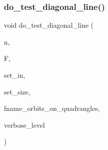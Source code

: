 \subsubsection{\texorpdfstring{do\+\_\+test\+\_\+diagonal\+\_\+line()}{do\_test\_diagonal\_line()}}
{\footnotesize\ttfamily void do\+\_\+test\+\_\+diagonal\+\_\+line (\begin{DoxyParamCaption}\item[{\mbox{\hyperlink{galois_8h_a09fddde158a3a20bd2dcadb609de11dc}{I\+NT}}}]{n,  }\item[{\mbox{\hyperlink{classfinite__field}{finite\+\_\+field}} $\ast$}]{F,  }\item[{\mbox{\hyperlink{galois_8h_a09fddde158a3a20bd2dcadb609de11dc}{I\+NT}} $\ast$}]{set\+\_\+in,  }\item[{\mbox{\hyperlink{galois_8h_a09fddde158a3a20bd2dcadb609de11dc}{I\+NT}}}]{set\+\_\+size,  }\item[{\mbox{\hyperlink{galois_8h_ab6cc7b4aeb6ea31aba2b3fbfc83ff5e6}{B\+Y\+TE}} $\ast$}]{fname\+\_\+orbits\+\_\+on\+\_\+quadrangles,  }\item[{\mbox{\hyperlink{galois_8h_a09fddde158a3a20bd2dcadb609de11dc}{I\+NT}}}]{verbose\+\_\+level }\end{DoxyParamCaption})}


